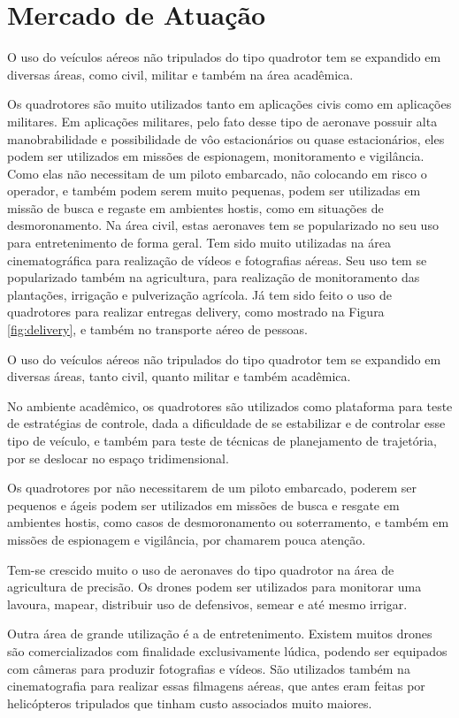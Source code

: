 \section{Mercado de Atuação}

O uso do veículos aéreos não tripulados do tipo quadrotor tem se expandido em diversas áreas, como civil, militar e também na área acadêmica. 

Os quadrotores são muito utilizados tanto em aplicações civis como em aplicações militares. Em aplicações militares, pelo fato desse tipo de aeronave possuir alta manobrabilidade e possibilidade de vôo estacionários ou quase estacionários, eles podem ser utilizados em missões de espionagem, monitoramento e vigilância. Como elas não necessitam de um piloto embarcado, não colocando em risco o operador, e também podem serem muito pequenas, podem ser utilizadas em missão de busca e regaste em ambientes hostis, como em situações de desmoronamento. Na área civil, estas aeronaves tem se popularizado no seu uso para entretenimento de forma geral. Tem sido muito utilizadas na área cinematográfica para realização de vídeos e fotografias aéreas. Seu uso tem se popularizado também na agricultura, para realização de monitoramento das plantações, irrigação e pulverização agrícola. Já tem sido feito o uso de quadrotores para realizar entregas delivery, como mostrado na Figura \ref{fig:delivery}, e também no transporte aéreo de pessoas.  

O uso do veículos aéreos não tripulados do tipo quadrotor tem se expandido em diversas áreas, tanto civil, quanto militar e também acadêmica.

No ambiente acadêmico, os quadrotores são utilizados como plataforma para teste de estratégias de controle, dada a dificuldade de se estabilizar e de controlar esse tipo de veículo, e também para teste de técnicas de planejamento de trajetória, por se deslocar no espaço tridimensional.

Os quadrotores por não necessitarem de um piloto embarcado, poderem ser pequenos e ágeis podem ser utilizados em missões de busca e resgate em ambientes hostis, como casos de desmoronamento ou soterramento, e também em missões de espionagem e vigilância, por chamarem pouca atenção.

Tem-se crescido muito o uso de aeronaves do tipo quadrotor na área de agricultura de precisão. Os drones podem ser utilizados para monitorar uma lavoura, mapear, distribuir uso de defensivos, semear e até mesmo irrigar.

Outra área de grande utilização é a de entretenimento. Existem muitos drones são comercializados com finalidade exclusivamente lúdica, podendo ser equipados com câmeras para produzir fotografias e vídeos. São utilizados também na cinematografia para realizar essas filmagens aéreas, que antes eram feitas por helicópteros tripulados que tinham custo associados muito maiores.

